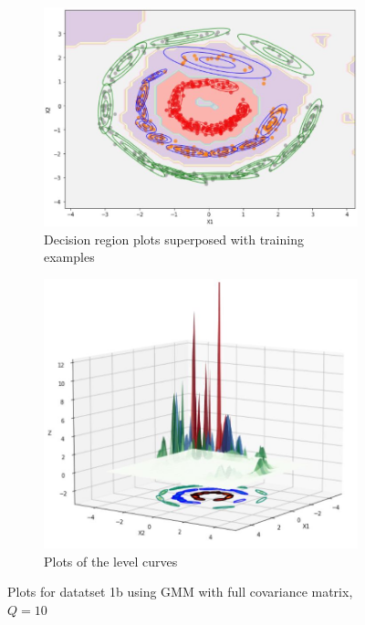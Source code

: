 \documentclass[11pt]{article}
\begin{document}
\begin{figure}[h]
\centering
	\begin{subfigure}[b]{0.45\textwidth}
	\centering
	\includegraphics[scale=0.35]{dataset1b_k10_fullC_GMM_2D.jpg}
	\caption{Decision region plots superposed with training examples}
	\label{fig:fig2.2.3.1}
	\end{subfigure}
	\hfill
	\begin{subfigure}[b]{0.45\textwidth}
	\centering
	\includegraphics[scale=0.35]{dataset1b_k10_fullC_GMM_3D.jpg}
	\caption{Plots of the level curves}
	\label{fig:fig2.2.3.2}
	\end{subfigure}
\caption{Plots for datatset 1b using GMM with full covariance matrix, $Q= 10$}
\label{fig:fig1.2.1}
\end{figure}
\end{document}
